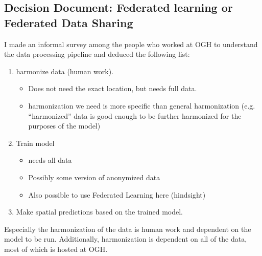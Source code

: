 \documentclass[journal, dvipsnames]{IEEEtran}
\begin{document}
\subsection{Decision Document: Federated learning or Federated Data Sharing}\label{summary_DecisionDocument}

I made an informal survey among the people who worked at OGH to understand the data processing pipeline and deduced the following list:
\begin{enumerate}
  \item harmonize data (human work).
  \begin{itemize}
    \item Does not need the exact location, but needs full data.
    \item harmonization we need is more specific than general harmonization (e.g. “harmonized” data is good enough to be further harmonized for the purposes of the model)
  \end{itemize}
  \item Train model
  \begin{itemize}
    \item needs all data
    \item Possibly some version of anonymized data
    \item Also possible to use Federated Learning here (hindsight)
  \end{itemize}
  \item Make spatial predictions based on the trained model.
\end{enumerate}
Especially the harmonization of the data is human work and dependent on the model to be run. Additionally, harmonization is dependent on all of the data, most of which is hosted at OGH. 
\end{document}

